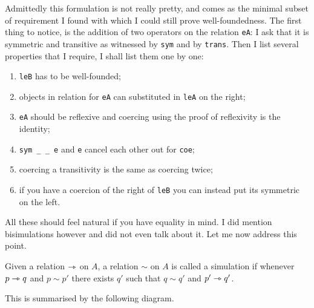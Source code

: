 Admittedly this formulation is not really pretty, and comes as the minimal
subset of requirement I found with which I could still prove well-foundedness.
The first thing to notice, is the addition of two operators on the relation
\texttt{eA}: I ask that it is symmetric and transitive as witnessed
by \texttt{sym} and by \texttt{trans}.
Then I list several properties that I require, I shall list them one by one:
\begin{enumerate}[label=(\roman*)]
  \item \texttt{leB} has to be well-founded;
  \item \label{item:dlexmod-sim} objects in relation for \texttt{eA}
  can substituted in \texttt{leA} on the right;
  \item \texttt{eA} should be reflexive and coercing using the proof
  of reflexivity is the identity;
  \item \texttt{sym _ _ e} and \texttt{e} cancel each other
  out for \texttt{coe};
  \item coercing a transitivity is the same as coercing twice;
  \item if you have a coercion of the right of \texttt{leB} you can
  instead put its symmetric on the left.
\end{enumerate}

All these should feel natural if you have equality in mind.
I did mention bisimulations however and did not even talk about it.
Let me now address this point.

\begin{definition}[Simulation]
  Given a relation \(\rightarrowtriangle\) on \(A\), a relation \(\sim\) on \(A\) is called a
  simulation if whenever \(p \rightarrowtriangle q\) and \(p \sim p'\) there exists \(q'\)
  such that \(q \sim q'\) and \(p' \rightarrowtriangle q'\).
\end{definition}

This is summarised by the following diagram.
\begin{center}
\end{center}

